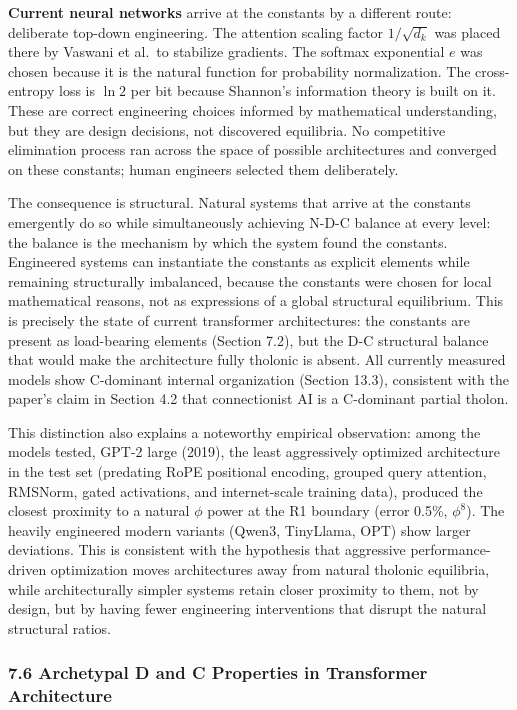 \documentclass[
  11pt,
  letterpaper,
]{article}
\begin{document}
\textbf{Current neural networks} arrive at the constants by a different
route: deliberate top-down engineering. The attention scaling factor
\(1/\sqrt{d_k}\) was placed there by Vaswani et al.~to stabilize
gradients. The softmax exponential \(e\) was chosen because it is the
natural function for probability normalization. The cross-entropy loss
is \(\ln 2\) per bit because Shannon's information theory is built on
it. These are correct engineering choices informed by mathematical
understanding, but they are design decisions, not discovered equilibria.
No competitive elimination process ran across the space of possible
architectures and converged on these constants; human engineers selected
them deliberately.

The consequence is structural. Natural systems that arrive at the
constants emergently do so while simultaneously achieving N-D-C balance
at every level: the balance is the mechanism by which the system found
the constants. Engineered systems can instantiate the constants as
explicit elements while remaining structurally imbalanced, because the
constants were chosen for local mathematical reasons, not as expressions
of a global structural equilibrium. This is precisely the state of
current transformer architectures: the constants are present as
load-bearing elements (Section 7.2), but the D-C structural balance that
would make the architecture fully tholonic is absent. All currently
measured models show C-dominant internal organization (Section 13.3),
consistent with the paper's claim in Section 4.2 that connectionist AI
is a C-dominant partial tholon.

This distinction also explains a noteworthy empirical observation: among
the models tested, GPT-2 large (2019), the least aggressively optimized
architecture in the test set (predating RoPE positional encoding,
grouped query attention, RMSNorm, gated activations, and internet-scale
training data), produced the closest proximity to a natural \(\phi\)
power at the R1 boundary (error 0.5\%, \(\phi^8\)). The heavily
engineered modern variants (Qwen3, TinyLlama, OPT) show larger
deviations. This is consistent with the hypothesis that aggressive
performance-driven optimization moves architectures away from natural
tholonic equilibria, while architecturally simpler systems retain closer
proximity to them, not by design, but by having fewer engineering
interventions that disrupt the natural structural ratios.

\subsubsection{7.6 Archetypal D and C Properties in Transformer
Architecture}\label{archetypal-d-and-c-properties-in-transformer-architecture}
\end{document}
